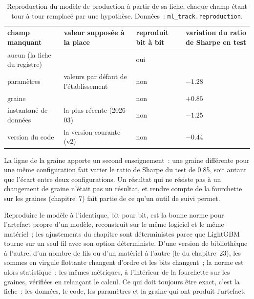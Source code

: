 \begin{table}[htbp]
\centering\small
\begin{tabular}{@{}>{\raggedright\arraybackslash}p{3.6cm}>{\raggedright\arraybackslash}p{4.6cm}>{\centering\arraybackslash}p{2.4cm}>{\centering\arraybackslash}p{3.4cm}@{}}
\toprule
champ manquant & valeur supposée à la place & reproduit bit à bit & variation du ratio de Sharpe en test\\
\midrule
aucun (la fiche du registre) & & oui & 0\\
paramètres & valeurs par défaut de l'établissement & non & $-1.28$\\
graine & 1 & non & $+0.85$\\
instantané de données & la plus récente (2026-03) & non & $-1.25$\\
version du code & la version courante (v2) & non & $-0.44$\\
\bottomrule
\end{tabular}
\caption{Reproduction du modèle de production à partir de sa fiche, chaque champ étant tour à tour remplacé par une hypothèse. Données~:
\texttt{ml\_track.reproduction}.}\label{tab:ml:exp:ablation}
\end{table}

La ligne de la graine apporte un second enseignement~: une graine différente pour une même configuration fait varier le ratio de Sharpe du test de 0.85, soit autant que
l'écart entre deux configurations. Un résultat qui ne résiste pas à un changement de graine n'était pas un résultat, et rendre compte
de la fourchette sur les graines (chapitre~7) fait partie de ce qu'un outil de suivi permet.

Reproduire le modèle à l'identique, bit pour bit, est la bonne norme pour l'artefact propre d'un modèle, reconstruit sur le même logiciel et le même matériel~; les ajustements du chapitre
sont déterministes parce que LightGBM tourne sur un seul fil avec son option déterministe. D'une version de bibliothèque à l'autre, d'un nombre de fils
ou d'un matériel à l'autre (le  du chapitre~23), les sommes en virgule flottante changent d'ordre et les bits changent~; la norme est alors statistique~:
les mêmes métriques, à l'intérieur de la fourchette sur les graines, vérifiées en relançant le calcul. Ce qui doit toujours être exact, c'est la fiche~: les données, le code,
les paramètres et la graine qui ont produit l'artefact.

